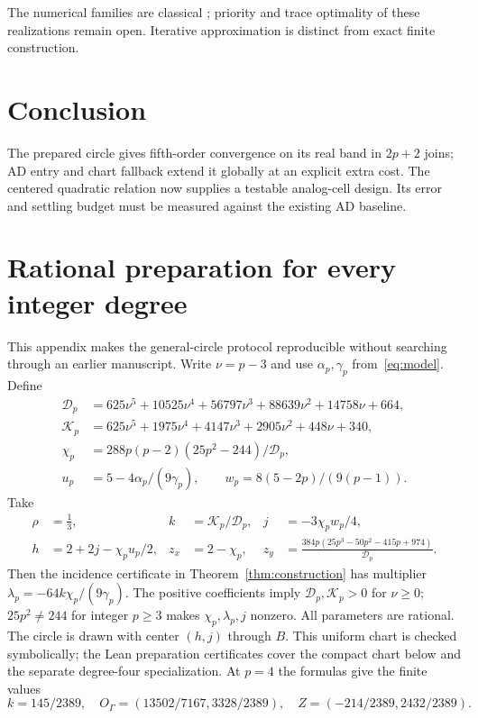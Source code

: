 \documentclass[11pt,a4paper]{article}
\begin{document}
The numerical families are classical \cite{dlmf38,laszkiewicz2009,baker1996}; priority and trace optimality of these realizations remain open. Iterative approximation is distinct from exact finite construction.

\section{Conclusion}
The prepared circle gives fifth-order convergence on its real band in $2p+2$ joins; AD entry and chart fallback extend it globally at an explicit extra cost. The centered quadratic relation now supplies a testable analog-cell design. Its error and settling budget must be measured against the existing AD baseline.

\clearpage
\appendix
\section{Rational preparation for every integer degree}\label{app:prep}
This appendix makes the general-circle protocol reproducible without searching through an earlier manuscript. Write $\nu=p-3$ and use $\alpha_p,\gamma_p$ from~\eqref{eq:model}. Define
\begin{align*}
 \mathcal D_p&=625\nu^5+10525\nu^4+56797\nu^3+88639\nu^2+14758\nu+664,\\
 \mathcal K_p&=625\nu^5+1975\nu^4+4147\nu^3+2905\nu^2+448\nu+340,\\
 \chi_p&=288p(p-2)(25p^2-244)/\mathcal D_p,\\
 u_p&=5-4\alpha_p/(9\gamma_p),\qquad w_p=8(5-2p)/(9(p-1)).
\end{align*}
Take
\begin{align*}
 \rho&=\tfrac13,& k&=\mathcal K_p/\mathcal D_p,& j&=-3\chi_pw_p/4,\\
 h&=2+2j-\chi_pu_p/2,&z_x&=2-\chi_p,&
 z_y&=\frac{384p(25p^3-50p^2-415p+974)}{\mathcal D_p}.
\end{align*}
Then the incidence certificate in Theorem~\ref{thm:construction} has multiplier $\lambda_p=-64k\chi_p/(9\gamma_p)$. The positive coefficients imply $\mathcal D_p,\mathcal K_p>0$ for $\nu\ge0$; $25p^2\ne244$ for integer $p\ge3$ makes $\chi_p,\lambda_p,j$ nonzero. All parameters are rational. The circle is drawn with center $(h,j)$ through $B$. This uniform chart is checked symbolically; the Lean preparation certificates cover the compact chart below and the separate degree-four specialization.
At $p=4$ the formulas give the finite values
\[
 k=145/2389,\quad O_\Gamma=(13502/7167,3328/2389),\quad
 Z=(-214/2389,2432/2389).
\]
\end{document}

